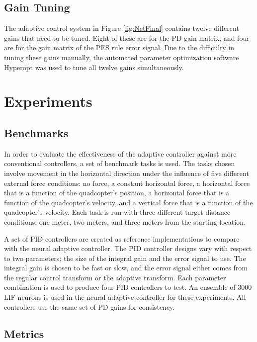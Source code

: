 \documentclass[letterpaper, 10 pt, conference]{ieeeconf}  %
\begin{document}
\subsection{Gain Tuning}

The adaptive control system in Figure \ref{fig:NetFinal} contains twelve different gains that need to be tuned.
Eight of these are for the PD gain matrix, and four are for the gain matrix of the PES rule error signal.
Due to the difficulty in tuning these gains manually, the automated parameter optimization software Hyperopt \cite{bergstra2015hyperopt} was used to tune all twelve gains simultaneously.


\section{Experiments}

\subsection{Benchmarks}

In order to evaluate the effectiveness of the adaptive controller against more conventional controllers, a set of benchmark tasks is used.
The tasks chosen involve movement in the horizontal direction under the influence of five different external force conditions: no force, a constant horizontal force, a horizontal force that is a function of the quadcopter's position, a horizontal force that is a function of the quadcopter's velocity, and a vertical force that is a function of the quadcopter's velocity.
Each task is run with three different target distance conditions: one meter, two meters, and three meters from the starting location.

A set of PID controllers are created as reference implementations to compare with the neural adaptive controller.
The PID controller designs vary with respect to two parameters; the size of the integral gain and the error signal to use.
The integral gain is chosen to be fast or slow, and the error signal either comes from the regular control transform or the adaptive transform.
Each parameter combination is used to produce four PID controllers to test. 
An ensemble of 3000 LIF neurons is used in the neural adaptive controller for these experiments.
All controllers use the same set of PD gains for consistency.

\subsection{Metrics}
\end{document}
